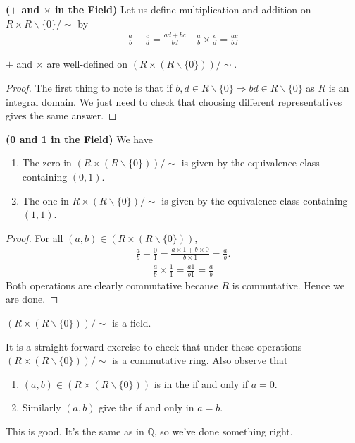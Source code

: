 \documentclass{article}
\newcommand{\bfs}[1]{\textbf{({#1}) }}
\begin{document}
\begin{defa}\bfs{$+$ and $\times$ in the Field}
Let us define multiplication and addition on $R \times R \backslash\{0\} / \sim$ by 
\begin{align*}
\frac{a}{b}+\frac{c}{d}=\frac{a d+b c}{b d} \quad \frac{a}{b} \times \frac{c}{d}=\frac{a c}{b d}
\end{align*}
\end{defa}
\begin{lema}
 $+$ and $\times$ are well-defined on $(R \times(R \backslash\{0\})) / \sim$.
\end{lema}
\begin{proof}
The first thing to note is that if $b, d \in R \backslash\{0\} \Rightarrow b d \in R \backslash\{0\}$ as $R$ is an integral domain. We just need to check that choosing different representatives gives the same answer.
\end{proof}
\begin{cora}\bfs{0 and 1 in the Field}We have
\begin{enumerate}
    \item The zero in $(R \times(R \backslash\{0\})) / \sim$ is given by the equivalence class containing $(0,1)$.
    \item The one in $R \times(R \backslash\{0\}) / \sim$ is given by the equivalence class containing $(1,1)$.
\end{enumerate}
\end{cora}
\begin{proof}
For all $(a, b) \in(R \times(R \backslash\{0\}))$,
\begin{align*}
\frac{a}{b}+\frac{0}{1}=\frac{a \times 1+b \times 0}{b \times 1}=\frac{a}{b} .
\end{align*}
\begin{align*}
\frac{a}{b} \times \frac{1}{1}=\frac{a 1}{b 1}=\frac{a}{b}
\end{align*}
Both operations are clearly commutative because $R$ is commutative. Hence we are done.
\end{proof}
\begin{thma}
 $(R \times(R \backslash\{0\})) / \sim$ is a field.
\end{thma}
\begin{rema}\label{rem:zncnffe}
It is a straight forward exercise to check that under these operations $(R \times(R \backslash\{0\})) / \sim$ is a commutative ring. Also observe that 
\begin{enumerate}
    \item $(a, b) \in(R \times(R \backslash\{0\}))$ is in the  if and only if $a=0$.
    \item Similarly $(a, b)$ give the  if and only in $a=b$. 
\end{enumerate} 
This is good. It's the same as in $\mathbb{Q}$, so we've done something right.
\end{rema}
\end{document}
